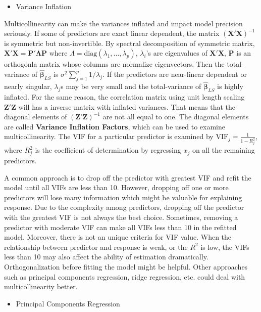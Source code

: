 \documentclass[
  11pt,
  openany]{memoir}
\providecommand{\tightlist}{%
  \setlength{\itemsep}{0pt}\setlength{\parskip}{0pt}}
\begin{document}
\begin{itemize}
\tightlist
\item
  Variance Inflation
\end{itemize}

Multicollinearity can make the variances inflated and impact model precision seriously. If some of predictors are exact linear dependent, the matrix \((\mathbf{X'X})^{-1}\) is symmetric but non-invertible. By spectral decomposition of symmetric matrix, \(\mathbf{X'X}=\mathbf{P'\Lambda P}\) where \(\Lambda=\text{diag}(\lambda_1,...,\lambda_p)\), \(\lambda_i\)'s are eigenvalues of \(\mathbf{X'X}\), \(\mathbf{P}\) is an orthogonla matrix whose columns are normalize eigenvectors. Then the total-variance of \(\boldsymbol{\hat\beta}_{LS}\) is \(\sigma^2\sum_{j=1}^p1/\lambda_j\).
If the predictors are near-linear dependent or nearly singular, \(\lambda_j\)s may be very small and the total-variance of \(\boldsymbol{\hat\beta}_{LS}\) is highly inflated.
For the same reason, the correlation matrix using unit length scaling \(\mathbf{Z'Z}\) will has a inverse matrix with inflated variances. That means that the diagonal elements of \((\mathbf{Z'Z})^{-1}\) are not all equal to one. The diagonal elements are called \textbf{Variance Inflation Factors}, which can be used to examine multicollinearity. The VIF for a particular predictor is examined by \(\mathrm{VIF}_j=\frac{1}{1-R_j^2}\),
where \(R_j^2\) is the coefficient of determination by regressing \(x_j\) on all the remaining predictors.

A common approach is to drop off the predictor with greatest VIF and refit the model until all VIFs are less than 10. However, dropping off one or more predictors will lose many information which might be valuable for explaining response. Due to the complexity among predictors, dropping off the predictor with the greatest VIF is not always the best choice. Sometimes, removing a predictor with moderate VIF can make all VIFs less than 10 in the refitted model. Moreover, there is not an unique criteria for VIF value. When the relationship between predictor and response is weak, or the \(R^2\) is low, the VIFs less than 10 may also affect the ability of estimation dramatically.
Orthogonalization before fitting the model might be helpful. Other approaches such as principal components regression, ridge regression, etc. could deal with multicollinearity better.

\begin{itemize}
\tightlist
\item
  Principal Components Regression
\end{itemize}
\end{document}
